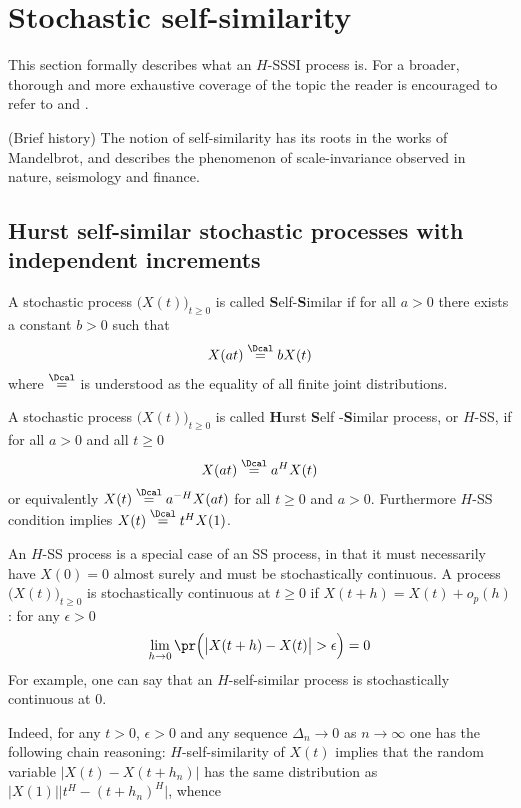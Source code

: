 



\section{Stochastic self-similarity} %
\label{sec:stochastic_self_similarity}

This section formally describes what an $H$-SSSI process is. For a broader, thorough
and more exhaustive coverage of the topic the reader is encouraged to refer to
\cite{embrechtsselfsimilar}%
and \cite{embrechts2000introduction}. %

(Brief history) The notion of self-similarity has its roots in the works of Mandelbrot,
and describes the phenomenon of scale-invariance observed in nature, seismology and
finance.

\subsection{Hurst self-similar stochastic processes with independent increments} %
\label{sub:hurst_self_similar_stochastic_processes_with_independent_increments}

A stochastic process $\bigl(X(t)\bigr)_{t\geq0}$ is called \textbf{S}elf-\textbf{S}imilar
if for all $a>0$ there exists a constant $b>0$ such that
\[ X(at) \overset{\Dcal}{=} b X(t) \]
where $\overset{\Dcal}{=}$ is understood as the equality of all finite joint distributions.

A stochastic process $\bigl(X(t)\bigr)_{t\geq0}$ is called \textbf{H}urst \textbf{S}elf
-\textbf{S}imilar process, or $H$-SS, if for all $a>0$ and all $t\geq 0$
\[ X(at) \overset{\Dcal}{=} a^H X(t) \]
or equivalently $X(t)\overset{\Dcal}{=} a^{-H} X(at)$ for all $t\geq 0$ and $a>0$.
Furthermore $H$-SS condition implies $ X(t) \overset{\Dcal}{=} t^H X(1) $.

An $H$-SS process is a special case of an SS process, in that it must necessarily
have $X(0) = 0$ almost surely and must be stochastically continuous. A process
$\bigl(X(t)\bigr)_{t\geq0}$ is stochastically continuous at $t\geq 0$ if $X(t+h) = X(t) + o_p(h)$:
for any $\epsilon>0$
\[
\lim_{h\to 0} \pr\Bigl( \bigl\lvert X(t+h) - X(t)\bigr\rvert > \epsilon \Bigr) = 0
\]
For example, one can say that an $H$-self-similar process is stochastically continuous at $0$.

Indeed, for any $t>0$, $\epsilon>0$ and any sequence $\Delta_n\to 0$ as $n\to \infty$
one has the following chain reasoning: $H$-self-similarity of $X(t)$ implies that
the random variable $\lvert X(t) - X(t+h_n) \rvert$ has the same distribution as
$|X(1)|\bigl\lvert t^H - (t+h_n)^H \bigr\rvert$, whence


